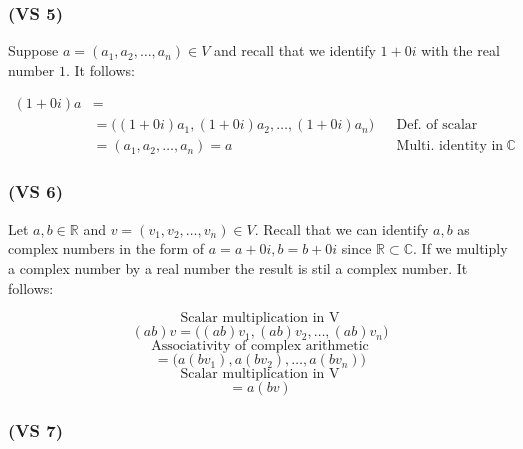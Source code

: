 \documentclass{article}
\begin{document}
\subsubsection*{(VS 5)}

Suppose \(a = (a_{1}, a_{2}, \dots, a_{n}) \in V\) and recall that we identify \(1 + 0i\) with the real number \(1\). 
It follows:

\begin{align*}
    (1 + 0i)a &= \\ 
    &= \Big((1 + 0i)a_{1}, (1 + 0i)a_{2}, \dots, (1 + 0i)a_{n}\Big) && \text{Def. of scalar multi. in V} \\
    &= (a_{1}, a_{2}, \dots, a_{n}) = a && \text{Multi. identity in \(\mathbb{C}\)}
\end{align*}

\subsubsection*{(VS 6)}

Let \(a, b \in \mathbb{R}\) and \(v = (v_{1}, v_{2}, \dots, v_{n}) \in V\). Recall that we can identify \(a, b\) as complex numbers
in the form of \(a = a + 0i, b = b + 0i\) since \(\mathbb{R} \subset \mathbb{C}\). 
If we multiply a complex number by a real number the result is stil a complex number. It follows:

\begin{equation*}
    \text{Scalar multiplication in V}
\end{equation*}
\begin{equation*}
    (ab)v = \Big((ab)v_{1}, (ab)v_{2}, \dots, (ab)v_{n}\Big)
\end{equation*}
\begin{equation*}
    \text{Associativity of complex arithmetic}
\end{equation*}
\begin{equation*}
    = \Big(a(bv_{1}), a(bv_{2}), \dots, a(bv_{n})\Big)
\end{equation*}
\begin{equation*}
    \text{Scalar multiplication in V}
\end{equation*}
\begin{equation*}
    = a(bv)
\end{equation*}

\subsubsection*{(VS 7)}
\end{document}
